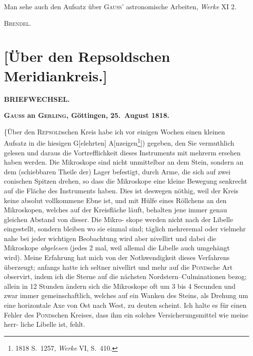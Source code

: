 \documentclass[12pt,a4paper]{article}
\theoremstyle{plain}
\theoremstyle{definition}
\theoremstyle{remark}
\begin{document}
Man sehe auch den Aufsatz \"{u}ber \textsc{Gauss}' astronomische Arbeiten, \textit{Werke} XI 2.

\begin{flushright}
\textsc{Brendel}.
\end{flushright}

\newpage
\section*{[\"{U}ber den Repsoldschen Meridiankreis.]}

\begin{center}
\Large\textbf{BRIEFWECHSEL.}
\end{center}

\medskip
\textbf{\textsc{Gauss} an \textsc{Gerling}, G\"{o}ttingen, 25.\ August 1818.}

\medskip
\{\"{U}ber den \textsc{Repsold}schen Kreis habe ich vor einigen Wochen
einen kleinen Aufsatz in die hiesigen G[elehrten] A[nzeigen\footnote{1818 S.\ 1257, \textit{Werke} VI, S.\ 410.}]) gegeben, den
Sie vermuthlich gelesen und daraus die Vortrefflichkeit dieses Instruments
mit mehrerm ersehen haben werden. Die Mikroskope sind nicht unmittelbar
an dem Stein, sondern an dem (schiebbaren Theile der) Lager befestigt, durch
Arme, die sich auf zwei conischen Spitzen drehen, so dass die Mikroskope
eine kleine Bewegung senkrecht auf die Fl\"{a}che des Instruments haben. Dies
ist deswegen n\"{o}thig, weil der Kreis keine absolut vollkommene Ebne ist, und
mit H\"{u}lfe eines R\"{o}llchens an den Mikroskopen, welches auf der Kreisfl\"{a}che
l\"{a}uft, behalten jene immer genau gleichen Abstand von dieser. Die Mikro-
skope werden nicht nach der Libelle eingestellt, sondern bleiben wo sie einmal
sind; t\"{a}glich mehreremal oder vielmehr nahe bei jeder wichtigen Beobachtung
wird aber nivellirt und dabei die Mikroskope \textit{abgelesen} (jedes 2 mal, weil
allemal die Libelle auch umgeh\"{a}ngt wird). Meine Erfahrung hat mich von
der Nothwendigkeit dieses Verfahrens \"{u}berzeugt; anfangs hatte ich seltner
nivellirt und mehr auf die \textsc{Pond}sche Art observirt, indem ich die Sterne auf
die n\"{a}chsten Nordstern--Culminationen bezog; allein in 12 Stunden \"{a}ndern
sich die Mikroskope oft um 3 bis 4 Secunden und zwar immer gemeinschaftlich,
welches auf ein Wanken des Steins, als Drehung um eine horizontale Axe
von Ost nach West, zu deuten scheint. Ich halte es f\"{u}r einen Fehler des
\textsc{Pond}schen Kreises, dass ihm ein solches Versicherungsmittel wie meine herr-
liche Libelle ist, fehlt.
\end{document}
